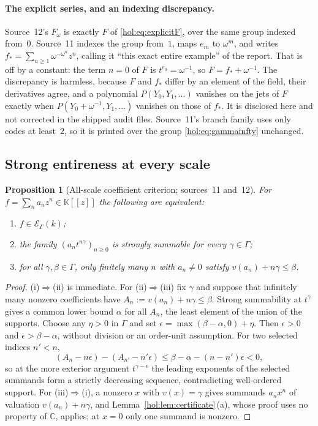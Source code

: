 \documentclass[11pt]{article}
\numberwithin{equation}{section}
\newtheorem{proposition}[theorem]{Proposition}
\theoremstyle{definition}
\theoremstyle{remark}
\newcommand{\C}{\mathbb C}
\newcommand{\KK}{\mathbb K}
\newcommand{\EK}{\mathcal E_\Gamma(k)}
\begin{document}
\paragraph{The explicit series, and an indexing discrepancy.}
Source~12's $F_\omega$ is exactly $F$ of \eqref{hol:eq:explicitF}, over the
same group indexed from~$0$. Source~11 indexes the group from~$1$, maps $e_m$
to $\omega^m$, and writes $f_*=\sum_{n\ge1}\omega^{-\omega^n}z^n$, calling it
``this exact entire example'' of the report. That is off by a constant: the
term $n=0$ of $F$ is $t^{e_0}=\omega^{-1}$, so $F=f_*+\omega^{-1}$. The
discrepancy is harmless, because $F$ and $f_*$ differ by an element of the
field, their derivatives agree, and a polynomial $P(Y_0,Y_1,\ldots)$
vanishes on the jets of $F$ exactly when $P(Y_0+\omega^{-1},Y_1,\ldots)$
vanishes on those of $f_*$. It is disclosed here and not corrected in the
shipped audit files. Source~11's branch family uses only codes at least~$2$,
so it is printed over the group \eqref{hol:eq:gammainfty} unchanged.

\subsection{Strong entireness at every scale}\label{hol:cf:sub:criterion}

\begin{proposition}[All-scale coefficient criterion; sources~11 and~12]
\label{hol:cf:prop:criterion}
For $f=\sum_na_nz^n\in\KK[[z]]$ the following are equivalent:
\begin{enumerate}[label=\textup{(\roman*)}]
\item $f\in\EK$;
\item the family $(a_nt^{n\gamma})_{n\ge0}$ is strongly summable for every
$\gamma\in\Gamma$;
\item for all $\gamma,\beta\in\Gamma$, only finitely many $n$ with $a_n\ne0$
satisfy $v(a_n)+n\gamma\le\beta$.
\end{enumerate}
\end{proposition}

\begin{proof}
(i)$\Rightarrow$(ii) is immediate. For (ii)$\Rightarrow$(iii) fix $\gamma$
and suppose that infinitely many nonzero coefficients have
$A_n:=v(a_n)+n\gamma\le\beta$. Strong summability at $t^\gamma$ gives a common
lower bound $\alpha$ for all $A_n$, the least element of the union of the
supports. Choose any $\eta>0$ in $\Gamma$ and set
$\epsilon=\max(\beta-\alpha,0)+\eta$. Then $\epsilon>0$ and
$\epsilon>\beta-\alpha$, without division or an order-unit assumption.
For two selected indices $n'<n$,
\[
 (A_n-n\epsilon)-(A_{n'}-n'\epsilon)\le\beta-\alpha-(n-n')\epsilon<0,
\]
so at the more exterior argument $t^{\gamma-\epsilon}$ the leading exponents
of the selected summands form a strictly decreasing sequence, contradicting
well-ordered support. For (iii)$\Rightarrow$(i), a nonzero $x$ with
$v(x)=\gamma$ gives summands $a_nx^n$ of valuation $v(a_n)+n\gamma$, and
Lemma~\ref{hol:lem:certificate}\,(a), whose proof uses no property of $\C$,
applies; at $x=0$ only one summand is nonzero.
\end{proof}
\end{document}

